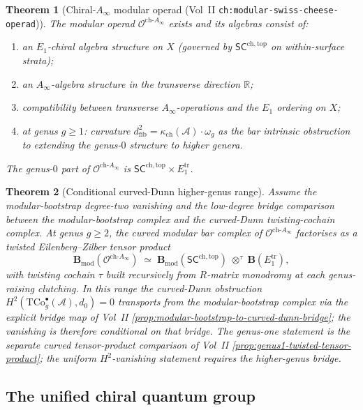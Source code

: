 \documentclass[11pt]{article}
\newtheorem{theorem}{Theorem}[section]
\theoremstyle{remark}
\providecommand{\cA}{\mathcal{A}}
\providecommand{\bR}{\mathbb{R}}
\providecommand{\Ainf}{A_\infty}
\providecommand{\SCchtop}{\mathsf{SC}^{\mathrm{ch},\mathrm{top}}}
\begin{document}
\begin{theorem}[Chiral-$\Ainf$ modular operad (Vol~II
\texttt{ch:modular-swiss-cheese-operad})]%
\label{thm:chiral-Ainf-modular-operad}%
The modular operad $\mathcal{O}^{\mathrm{ch}\text{-}\Ainf}$ exists
and its algebras consist of:
\begin{enumerate}[label=\textup{(\alph*)}]
\item an $E_1$-chiral algebra structure on $X$
  (governed by $\SCchtop$ on within-surface strata);
\item an $\Ainf$-algebra structure in the transverse direction $\bR$;
\item compatibility between transverse $\Ainf$-operations and the
  $E_1$ ordering on $X$;
\item at genus $g \ge 1$: curvature
  $d^2_{\mathrm{fib}} = \kappa_{\mathrm{ch}}(\cA) \cdot \omega_g$
  as the bar intrinsic obstruction to extending the genus-$0$
  structure to higher genera.
\end{enumerate}
The genus-$0$ part of $\mathcal{O}^{\mathrm{ch}\text{-}\Ainf}$
is $\SCchtop \times E_1^{\mathrm{tr}}$.
\end{theorem}

\begin{theorem}[Conditional curved-Dunn higher-genus range]%
\label{thm:curved-dunn-higher-genus-range}%
Assume the modular-bootstrap degree-two vanishing and the low-degree
bridge comparison between the modular-bootstrap complex and the
curved-Dunn twisting-cochain complex. At genus $g \ge 2$, the curved
modular bar complex of
$\mathcal{O}^{\mathrm{ch}\text{-}\Ainf}$ factorises as a twisted
Eilenberg--Zilber tensor product
\[
  \mathbf{B}_{\mathrm{mod}}(\mathcal{O}^{\mathrm{ch}\text{-}\Ainf})
  \;\simeq\;
  \mathbf{B}_{\mathrm{mod}}(\SCchtop)
  \;\otimes^{\tau}\;
  \mathbf{B}(E_1^{\mathrm{tr}}),
\]
with twisting cochain $\tau$ built recursively from $R$-matrix
monodromy at each genus-raising clutching. In this range the
curved-Dunn obstruction
$H^2(\mathrm{TCo}^\bullet_g(\cA), d_0) = 0$ transports from the
modular-bootstrap complex via the explicit bridge map of Vol~II
\ref*{prop:modular-bootstrap-to-curved-dunn-bridge}; the vanishing is
therefore conditional on that bridge.
The genus-one statement is the separate curved tensor-product
comparison of Vol~II \ref*{prop:genus1-twisted-tensor-product}; the
uniform $H^2$-vanishing statement requires the higher-genus bridge.
\end{theorem}

\subsection*{The unified chiral quantum group}
\end{document}
